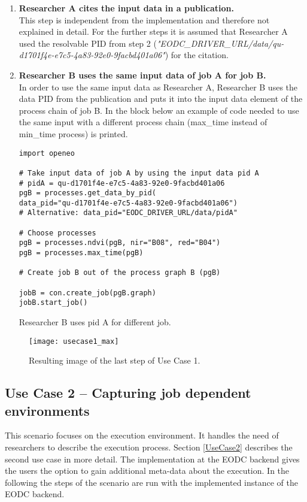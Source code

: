 \documentclass[draft,final]{vutinfth} %
\newenvironment{code}{\captionsetup{type=listing}}{}
\begin{document}
\begin{enumerate}
	\item \textbf{Researcher A cites the input data in a publication.} \\
	This step is independent from the implementation and therefore not explained in detail. For the further steps it is assumed that Researcher A used the resolvable PID from step 2 (\textit{"EODC\_DRIVER\_URL/data/qu-d1701f4e-e7c5-4a83-92e0-9facbd401a06"}) for the citation.   
	
	\item \textbf{Researcher B uses the same input data of job A for job B.} \\
	In order to use the same input data as Researcher A, Researcher B uses the data PID from the publication and puts it into the input data element of the process chain of job B. In the block below an example of code needed to use the same input with a different process chain (max\_time instead of min\_time process) is printed.   

\begin{code}
	\begin{verbatim}
import openeo

# Take input data of job A by using the input data pid A
# pidA = qu-d1701f4e-e7c5-4a83-92e0-9facbd401a06
pgB = processes.get_data_by_pid(
data_pid="qu-d1701f4e-e7c5-4a83-92e0-9facbd401a06")
# Alternative: data_pid="EODC_DRIVER_URL/data/pidA" 

# Choose processes
pgB = processes.ndvi(pgB, nir="B08", red="B04")
pgB = processes.max_time(pgB)

# Create job B out of the process graph B (pgB)

jobB = con.create_job(pgB.graph)
jobB.start_job()
	\end{verbatim}
	\caption{Researcher B uses pid A for different job.}
	\label{lst:impl_usecase1_3}
\end{code}
	
\end{enumerate}

\begin{figure}[h]
	\centering
	\texttt{[image: usecase1\_max]}
	\caption{Resulting image of the last step of Use Case 1.}
	\label{fig:impl_usecase1_max} %
\end{figure}

\subsection{Use Case 2 – Capturing job dependent environments}\label{Implementation:Use Case2}
This scenario focuses on the execution environment. It handles the need of researchers to describe the execution process. Section \ref{UseCase2} describes the second use case in more detail. The implementation at the EODC backend gives the users the option to gain additional meta-data about the execution. In the following the steps of the scenario are run with the implemented instance of the EODC backend.    
\end{document}

